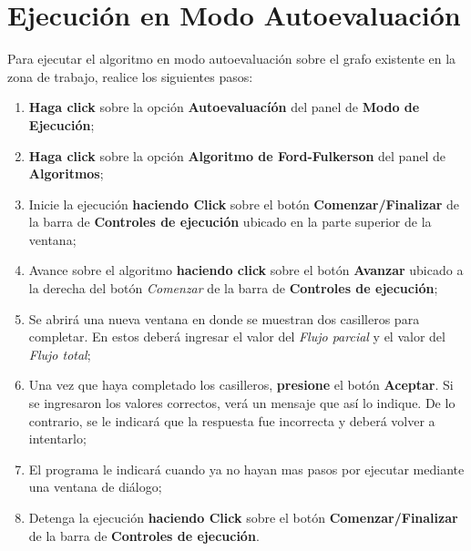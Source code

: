 \documentclass{book}
\begin{document}
\section{Ejecución en Modo Autoevaluación}

Para ejecutar el algoritmo en modo autoevaluación sobre el grafo existente en la zona de trabajo, realice los siguientes pasos:
\medskip

\begin{enumerate}
	\itemsep=8pt \topsep=0pt \partopsep=0pt \parskip=0pt \parsep=0pt

	\item \textbf{Haga click} sobre la opción \textbf{Autoevaluacíón} del panel de \textbf{Modo de Ejecución};

	\item \textbf{Haga click} sobre la opción \textbf{Algoritmo de Ford-Fulkerson} del panel de \textbf{Algoritmos};

	\item Inicie la ejecución \textbf{haciendo Click} sobre el botón \textbf{Comenzar/Finalizar} de la barra de \textbf{Controles de ejecución} ubicado en la parte superior de la ventana;

	\item Avance sobre el algoritmo \textbf{haciendo click} sobre el botón \textbf{Avanzar} ubicado a la derecha del botón \textit{Comenzar} de la barra de \textbf{Controles de ejecución};

	\item Se abrirá una nueva ventana en donde se muestran dos casilleros para completar. En estos deberá ingresar el valor del \textit{Flujo parcial} y el valor del \textit{Flujo total};

	\item Una vez que haya completado los casilleros, \textbf{presione} el botón \textbf{Aceptar}. Si se ingresaron los valores correctos, verá un mensaje que así lo indique. De lo contrario, se le indicará que la respuesta fue incorrecta y deberá volver a intentarlo;

	\item El programa le indicará cuando ya no hayan mas pasos por ejecutar mediante una ventana de diálogo;

	\item Detenga la ejecución \textbf{haciendo Click} sobre el botón \textbf{Comenzar/Finalizar} de la barra de \textbf{Controles de ejecución}.

\end{enumerate}
\medskip
\end{document}

